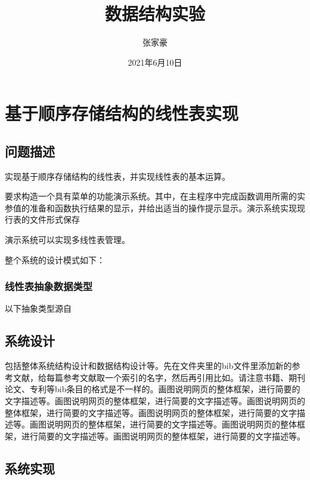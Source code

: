 \documentclass[supercite]{Experimental_Report}
\title{~~~~~~数据结构实验~~~~~~}
\author{张家豪}
\date{2021年6月10日}
\theoremstyle{definition}
\begin{document}
\maketitle

\clearpage


\tableofcontents[level=2]
\clearpage


\section{基于顺序存储结构的线性表实现}

\subsection{问题描述}

实现基于顺序存储结构的线性表，并实现线性表的基本运算。

要求构造一个具有菜单的功能演示系统。其中，在主程序中完成函数调用所需的实参值的准备和函数执行结果的显示，并给出适当的操作提示显示。演示系统实现现行表的文件形式保存

演示系统可以实现多线性表管理。

整个系统的设计模式如下：

\subsubsection{线性表抽象数据类型}

以下抽象类型源自

\subsection{系统设计}

包括整体系统结构设计和数据结构设计等。先在文件夹里的bib文件里添加新的参考文献，给每篇参考文献取一个索引的名字，然后再引用比如\cite{STR2021Neurocom}\cite{AVS2021Neurocom, Rezaei2014CVPR}。请注意书籍、期刊论文、专利等bib条目的格式是不一样的。画图说明网页的整体框架，进行简要的文字描述等。画图说明网页的整体框架，进行简要的文字描述等。画图说明网页的整体框架，进行简要的文字描述等。画图说明网页的整体框架，进行简要的文字描述等。画图说明网页的整体框架，进行简要的文字描述等。画图说明网页的整体框架，进行简要的文字描述等。画图说明网页的整体框架，进行简要的文字描述等。

\subsection{系统实现}
\end{document}

